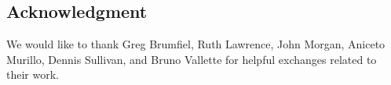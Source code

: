 
\subsection*{Acknowledgment}

We would like to thank Greg Brumfiel, Ruth Lawrence, John Morgan, Aniceto Murillo, Dennis Sullivan, and Bruno Vallette for helpful exchanges related to their work.